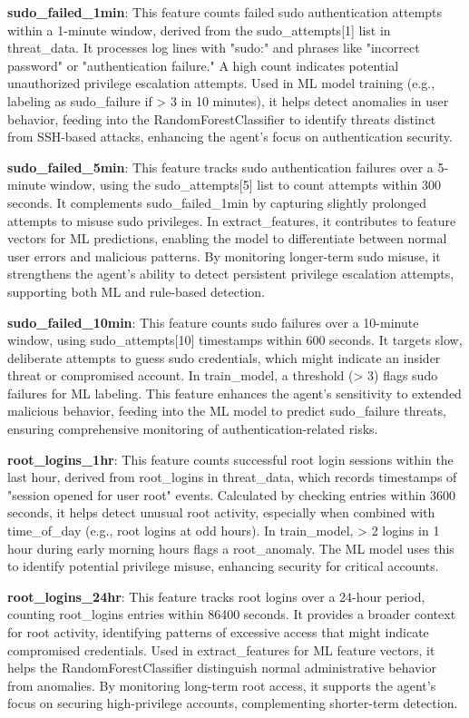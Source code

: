 \textbf{sudo\_failed\_1min}: This feature counts failed sudo authentication attempts within a 1-minute window, derived from the sudo\_attempts[1] list in threat\_data. It processes log lines with "sudo:" and phrases like "incorrect password" or "authentication failure." A high count indicates potential unauthorized privilege escalation attempts. Used in ML model training (e.g., labeling as sudo\_failure if > 3 in 10 minutes), it helps detect anomalies in user behavior, feeding into the RandomForestClassifier to identify threats distinct from SSH-based attacks, enhancing the agent’s focus on authentication security.

\textbf{sudo\_failed\_5min}: This feature tracks sudo authentication failures over a 5-minute window, using the sudo\_attempts[5] list to count attempts within 300 seconds. It complements sudo\_failed\_1min by capturing slightly prolonged attempts to misuse sudo privileges. In extract\_features, it contributes to feature vectors for ML predictions, enabling the model to differentiate between normal user errors and malicious patterns. By monitoring longer-term sudo misuse, it strengthens the agent’s ability to detect persistent privilege escalation attempts, supporting both ML and rule-based detection.

\textbf{sudo\_failed\_10min}: This feature counts sudo failures over a 10-minute window, using sudo\_attempts[10] timestamps within 600 seconds. It targets slow, deliberate attempts to guess sudo credentials, which might indicate an insider threat or compromised account. In train\_model, a threshold (> 3) flags sudo failures for ML labeling. This feature enhances the agent’s sensitivity to extended malicious behavior, feeding into the ML model to predict sudo\_failure threats, ensuring comprehensive monitoring of authentication-related risks.

\textbf{root\_logins\_1hr}: This feature counts successful root login sessions within the last hour, derived from root\_logins in threat\_data, which records timestamps of "session opened for user root" events. Calculated by checking entries within 3600 seconds, it helps detect unusual root activity, especially when combined with time\_of\_day (e.g., root logins at odd hours). In train\_model, > 2 logins in 1 hour during early morning hours flags a root\_anomaly. The ML model uses this to identify potential privilege misuse, enhancing security for critical accounts.

\textbf{root\_logins\_24hr}: This feature tracks root logins over a 24-hour period, counting root\_logins entries within 86400 seconds. It provides a broader context for root activity, identifying patterns of excessive access that might indicate compromised credentials. Used in extract\_features for ML feature vectors, it helps the RandomForestClassifier distinguish normal administrative behavior from anomalies. By monitoring long-term root access, it supports the agent’s focus on securing high-privilege accounts, complementing shorter-term detection.

